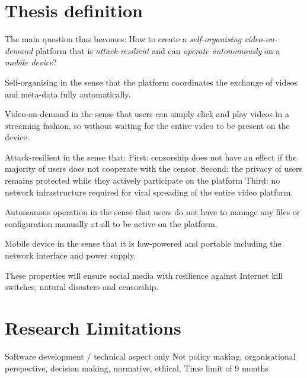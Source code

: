 \section{Thesis definition}
The main question thus becomes:
How to create a \emph{self-organising} \emph{video-on-demand} platform that is \emph{attack-resilient} and can \emph{operate autonomously} on a \emph{mobile device}?

Self-organising in the sense that the platform coordinates the exchange of videos and meta-data fully automatically.

Video-on-demand in the sense that users can simply click and play videos in a streaming fashion, so without waiting for the entire video to be present on the device.

Attack-resilient in the sense that:
First: censorship does not have an effect if the majority of users does not cooperate with the censor.
Second: the privacy of users remains protected while they actively participate on the platform
Third: no network infrastructure required for viral spreading of the entire video platform.

Autonomous operation in the sense that users do not have to manage any files or configuration manually at all to be active on the platform.

Mobile device in the sense that it is low-powered and portable including the network interface and power supply.

These properties will ensure social media with resilience against Internet kill switches, natural disasters and censorship.








\section{Research Limitations} %
Software development / technical aspect only
Not policy making, organisational perspective, decision making, normative, ethical,
Time limit of 9 months













